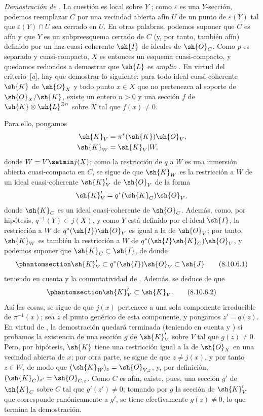 \documentclass[oneside,10pt]{amsart}
\newcommand{\oldpage}[2][]{\marginnote{\normalfont\footnotesize\textbf{#1}~|~#2}\ignorespaces}
\let\EGAOriginalLabel\label
\renewcommand{\label}[1]{\phantomsection\EGAOriginalLabel{#1}}
\begin{document}
\begin{env}[8.10.6]
\label{II.8.10.6}
\emph{Demostración de .}
La cuestión es local sobre $Y$ ;
como $\varepsilon$ es una $Y$-sección, podemos reemplazar $C$ por una vecindad abierta afín $U$ de un punto de $\varepsilon(Y)$ tal que $\varepsilon(Y)\cap U$ sea cerrado en $U$.
En otras palabras, podemos suponer que $C$ es afín y que $Y$ es un subpreesquema cerrado de $C$ (y, por tanto, también afín) definido por un haz cuasi-coherente
\oldpage[II]{188}
$\sh{I}$ de ideales de $\sh{O}_C$.
Como $p$ es separado y cuasi-compacto, $X$ es entonces un esquema cuasi-compacto, y quedamos reducidos a demostrar que $\sh{L}$ es \emph{amplio} .
En virtud del criterio~[\emph{a}], hay que demostrar lo siguiente:
para todo ideal cuasi-coherente $\sh{K}$ de $\sh{O}_X$ y todo punto $x\in X$ que no pertenezca al soporte de $\sh{O}_X/\sh{K}$, existe un entero $n>0$ y una sección $f$ de $\sh{K}\otimes\sh{L}^{\otimes n}$ sobre $X$ tal que $f(x)\neq0$.

Para ello, pongamos
\begin{align*}
  \sh{K}_V &= \pi^*(\sh{K})\sh{O}_V,\\
  \sh{K}_W &= \sh{K}_V|W,
\end{align*}
donde $W=V\setmin j(X)$;
como la restricción de $q$ a $W$ es una inmersión abierta cuasi-compacta en $C$, se sigue de  que $\sh{K}_W$ es la restricción a $W$ de un ideal cuasi-coherente $\sh{K}'_V$ de $\sh{O}_V$ de la forma
\[
    \sh{K}'_V = q^*(\sh{K}_C)\sh{O}_V,
\]
donde $\sh{K}_C$ es un ideal cuasi-coherente de $\sh{O}_C$.
Además, como, por hipótesis, $q^{-1}(Y)\subset j(X)$, y como $Y$ está definido por el ideal $\sh{I}$, la restricción a $W$ de $q^*(\sh{I})\sh{O}_V$ es igual a la de $\sh{O}_V$; por tanto, $\sh{K}_W$ es también la restricción a $W$ de $q^*(\sh{I}\sh{K}_C)\sh{O}_V$, y podemos suponer que $\sh{K}_C\subset\sh{I}$, de donde
\[
\label{II.8.10.6.1}
    \sh{K}'_V \subset q^*(\sh{I})\sh{O}_V \subset \sh{J}
\tag{8.10.6.1}
\]
teniendo en cuenta  y la conmutatividad de .
Además, se deduce de  que
\[
\label{II.8.10.6.2}
    \sh{K}'_V \subset \sh{K}_V.
\tag{8.10.6.2}
\]
Así las cosas, se sigue de  que $j(x)$ pertenece a una sola componente irreducible de $\pi^{-1}(x)$;
sea $z$ el punto genérico de esta componente, y pongamos $z'=q(z)$.
En virtud de , la demostración quedará terminada (teniendo en cuenta  y ) si probamos la existencia de una sección $g$ de $\sh{K}'_V$ sobre $V$ tal que $g(z)\neq0$.
Pero, por hipótesis, $\sh{K}$ tiene una restricción igual a la de $\sh{O}_X$ en una vecindad abierta de $x$;
por otra parte, se sigue de  que $z\neq j(x)$, y por tanto $z\in W$, de modo que $(\sh{K}_W)_z=\sh{O}_{V,z}$, y, por definición, $(\sh{K}_C)_{z'}=\sh{O}_{C,z}$.
Como $C$ es afín, existe, pues, una sección $g'$ de $\sh{K}_C$ sobre $C$ tal que $g'(z')\neq0$; tomando por $g$ la sección de $\sh{K}'_V$ que corresponde canónicamente a $g'$, se tiene efectivamente $g(z)\neq0$, lo que termina la demostración.
\end{env}
\end{document}
